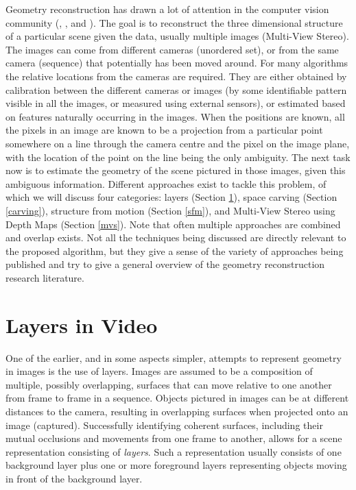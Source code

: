 

Geometry reconstruction has drawn a lot of attention in the computer vision community (, , and ). The goal is to reconstruct the three dimensional structure of a particular scene given the data, usually multiple images (Multi-View Stereo). The images can come from different cameras (unordered set), or from the same camera (sequence) that potentially has been moved around. For many algorithms the relative locations from the cameras are required. They are either obtained by calibration between the different cameras or images (\eg by some identifiable pattern visible in all the images, or measured using external sensors), or estimated based on features naturally occurring in the images. When the positions are known, all the pixels in an image are known to be a projection from a particular point somewhere on a line through the camera centre and the pixel on the image plane, with the location of the point on the line being the only ambiguity. The next task now is to estimate the geometry of the scene pictured in those images, given this ambiguous information. Different approaches exist to tackle this problem, of which we will discuss four categories: layers (Section \ref{layers}), space carving (Section \ref{carving}), structure from motion (Section \ref{sfm}), and Multi-View Stereo using Depth Maps (Section \ref{mvs}). Note that often multiple approaches are combined and overlap exists. Not all the techniques being discussed are directly relevant to the proposed algorithm, but they give a sense of the variety of approaches being published and try to give a general overview of the geometry reconstruction research literature.


\pagebreak
\section{Layers in Video}  \label{layers}
One of the earlier, and in some aspects simpler, attempts to represent geometry in images is the use of layers. Images are assumed to be a composition of multiple, possibly overlapping, surfaces that can move relative to one another from frame to frame in a sequence. Objects pictured in images can be at different distances to the camera, resulting in overlapping surfaces when projected onto an image (\ie captured). Successfully identifying coherent surfaces, including their mutual occlusions and movements from one frame to another, allows for a scene representation consisting of \emph{layers}. Such a representation usually consists of one background layer plus one or more foreground layers representing objects moving in front of the background layer.

